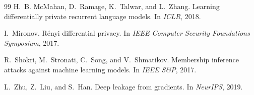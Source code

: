 \documentclass[11pt,a4paper]{article}
\begin{document}
\begin{thebibliography}{99}
H.~B. McMahan, D.~Ramage, K.~Talwar, and L.~Zhang.
\newblock Learning differentially private recurrent language models.
\newblock In \emph{ICLR}, 2018.

I.~Mironov.
\newblock Rényi differential privacy.
\newblock In \emph{IEEE Computer Security Foundations Symposium}, 2017.

R.~Shokri, M.~Stronati, C.~Song, and V.~Shmatikov.
\newblock Membership inference attacks against machine learning models.
\newblock In \emph{IEEE S\&P}, 2017.

L.~Zhu, Z.~Liu, and S.~Han.
\newblock Deep leakage from gradients.
\newblock In \emph{NeurIPS}, 2019.

\end{thebibliography}
\end{document}

